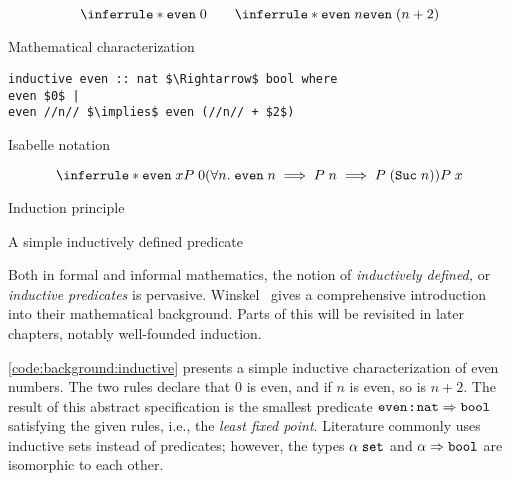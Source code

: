 \begin{code}
  \begin{subcode}[b]{.49\linewidth}
    \[
      \inferrule*{ }{\holconst{even}\;0} \qquad
      \inferrule*{\holconst{even}\;n}{\holconst{even}\;(n + 2)}
    \]
    \caption{Mathematical characterization}
  \end{subcode}\hfill
  \begin{subcode}[b]{.49\linewidth}
    \begin{lstlisting}
inductive even :: nat $\Rightarrow$ bool where
even $0$ |
even //n// $\implies$ even (//n// + $2$)\end{lstlisting}
    \caption{Isabelle notation}
  \end{subcode}
  \vspace{1em}

  \begin{subcode}{\linewidth}
    \[
      \inferrule*{
        \holconst{even}\;x \\
        P\;0\\
        (\forall n.\; \holconst{even}\;n \implies P\;n \implies P\;(\holconst{Suc}\;n))
      }{P\;x}
    \]
    \caption{Induction principle}
  \end{subcode}

  \caption{A simple inductively defined predicate}
  \label{code:background:inductive}
\end{code}

Both in formal and informal mathematics, the notion of \emph{inductively defined,} or \emph{inductive predicates} is pervasive.
Winskel~\cite{winskel1993semantics} gives a comprehensive introduction into their mathematical background.
Parts of this will be revisited in later chapters, notably well-founded induction.

\cref{code:background:inductive} presents a simple inductive characterization of even numbers.
The two rules declare that $0$ is even, and if $n$ is even, so is $n+2$.
The result of this abstract specification is the smallest predicate $\texttt{\textup{even}} \mathbin{:\!\!:} \texttt{\textup{nat}}\Rightarrow\texttt{\textup{bool}}$ satisfying the given rules, i.e., the \emph{least fixed point}.
Literature commonly uses inductive sets instead of predicates; however, the types $\alpha\;\texttt{\textup{set}}$ and $\alpha\Rightarrow\texttt{\textup{bool}}$ are isomorphic to each other.


